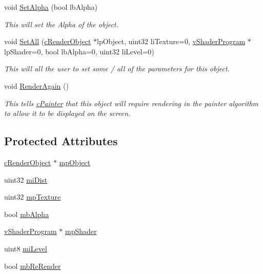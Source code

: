 \begin{DoxyCompactItemize}
void \hyperlink{classc_render_pointer_acb4e6f40867bc7f7592ba5c5d500f29e}{SetAlpha} (bool lbAlpha)
\begin{DoxyCompactList}\small\item\em This will set the Alpha of the object. \item\end{DoxyCompactList}\item 
void \hyperlink{classc_render_pointer_a1e9cbc7012a3c2750da6faa41035d5a4}{SetAll} (\hyperlink{classc_render_object}{cRenderObject} $\ast$lpObject, uint32 liTexture=0, \hyperlink{classv_shader_program}{vShaderProgram} $\ast$lpShader=0, bool lbAlpha=0, uint32 liLevel=0)
\begin{DoxyCompactList}\small\item\em This will all the user to set some / all of the parameters for this object. \item\end{DoxyCompactList}\item 
void \hyperlink{classc_render_pointer_af20604ed7f213fdae3496bb9693822d5}{RenderAgain} ()
\begin{DoxyCompactList}\small\item\em This tells \hyperlink{classc_painter}{cPainter} that this object will require rendering in the painter algorithm to allow it to be displayed on the screen. \item\end{DoxyCompactList}\end{DoxyCompactItemize}
\subsection*{Protected Attributes}
\begin{DoxyCompactItemize}
\item 
\hyperlink{classc_render_object}{cRenderObject} $\ast$ \hyperlink{classc_render_pointer_a3a931cfd60605a842ebf9d1b591adba8}{mpObject}
\item 
uint32 \hyperlink{classc_render_pointer_a0a87e7addf0caeb10eb7aee109ac958a}{miDist}
\item 
uint32 \hyperlink{classc_render_pointer_a70c8e938776212e3d8a56c2ab5e87489}{mpTexture}
\item 
bool \hyperlink{classc_render_pointer_a2dc85ebce3c5e5de3072c90ac88eaac6}{mbAlpha}
\item 
\hyperlink{classv_shader_program}{vShaderProgram} $\ast$ \hyperlink{classc_render_pointer_a52d59a73dafe36627f8e91fd7894ac4c}{mpShader}
\item 
uint8 \hyperlink{classc_render_pointer_a12ff5d23eb2efcaf720daa33f39c4938}{miLevel}
\item 
bool \hyperlink{classc_render_pointer_a7ef8dbb11d8bc69a9549db62a45679a7}{mbReRender}
\end{DoxyCompactItemize}
